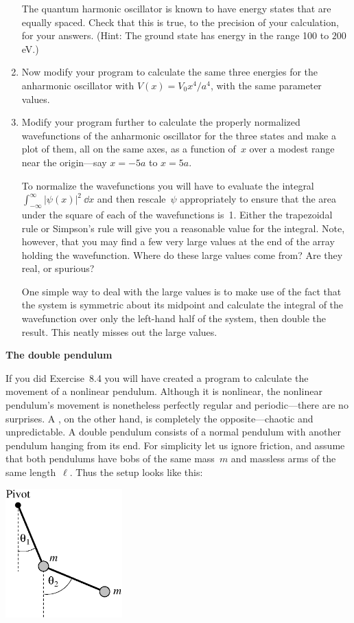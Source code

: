 \documentclass[12pt]{article}
\begin{document}
\begin{exercises}
\begin{enumerate}
  The quantum harmonic oscillator is known to have energy states that are
  equally spaced.  Check that this is true, to the precision of your
  calculation, for your answers.  (Hint: The ground state has energy in the
  range 100 to $200\,$eV.)
\item Now modify your program to calculate the same three energies for the
  anharmonic oscillator with $V(x) = V_0 x^4/a^4$, with the same
  parameter values.
\item Modify your program further to calculate the properly normalized
  wavefunctions of the anharmonic oscillator for the three states
  and make a plot of them, all on the same axes, as a function of~$x$ over
  a modest range near the origin---say $x=-5a$ to $x=5a$.

  To normalize the wavefunctions you will have to evaluate the integral
  $\int_{-\infty}^\infty |\psi(x)|^2\>\dd x$ and then rescale~$\psi$
  appropriately to ensure that the area under the square of each of the
  wavefunctions is~1.  Either the trapezoidal rule or Simpson's rule will
  give you a reasonable value for the integral.  Note, however, that you
  may find a few very large values at the end of the array holding the
  wavefunction.  Where do these large values come from?  Are they real, or
  spurious?

  One simple way to deal with the large values is to make use of the fact
  that the system is symmetric about its midpoint and calculate the
  integral of the wavefunction over only the left-hand half of the system,
  then double the result.  This neatly misses out the large values.
\end{enumerate}



\exercise \textbf{The double pendulum}

\exskip If you did Exercise~8.4 you will have created a program to
calculate the movement of a nonlinear pendulum.  Although it is nonlinear,
the nonlinear pendulum's movement is nonetheless perfectly regular and
periodic---there are no surprises.  A , on the other
hand, is completely the opposite---chaotic and unpredictable.  A double
pendulum consists of a normal pendulum with another pendulum hanging from
its end.  For simplicity let us ignore friction, and assume that both
pendulums have bobs of the same mass~$m$ and massless arms of the same
length~$\ell$.  Thus the setup looks like this:

\begin{center}
\includegraphics[width=4.5cm]{double.eps}
\end{center}


\end{exercises}
\end{document}
